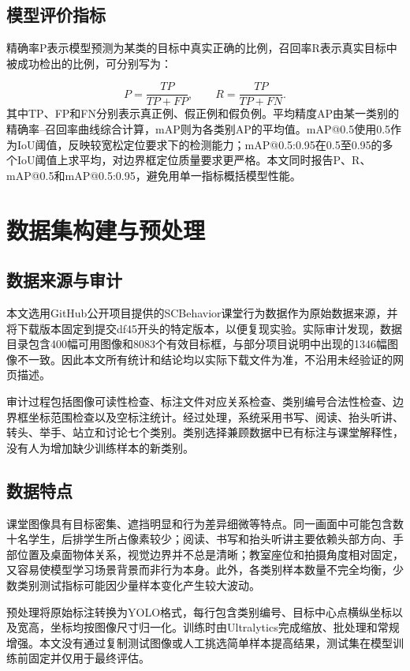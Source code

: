 \documentclass[12pt,hyperref,a4paper,UTF8]{ctexart}
\begin{document}
\subsection{模型评价指标}
精确率P表示模型预测为某类的目标中真实正确的比例，召回率R表示真实目标中被成功检出的比例，可分别写为：\par
\begin{equation}
P=\frac{TP}{TP+FP},\qquad R=\frac{TP}{TP+FN}.
\end{equation}
其中TP、FP和FN分别表示真正例、假正例和假负例。平均精度AP由某一类别的精确率--召回率曲线综合计算，mAP则为各类别AP的平均值。mAP@0.5使用0.5作为IoU阈值，反映较宽松定位要求下的检测能力；mAP@0.5:0.95在0.5至0.95的多个IoU阈值上求平均，对边界框定位质量要求更严格。本文同时报告P、R、mAP@0.5和mAP@0.5:0.95，避免用单一指标概括模型性能。\par
\section{数据集构建与预处理}
\subsection{数据来源与审计}
本文选用GitHub公开项目提供的SCBehavior课堂行为数据作为原始数据来源，并将下载版本固定到提交df45开头的特定版本，以便复现实验。实际审计发现，数据目录包含400幅可用图像和8083个有效目标框，与部分项目说明中出现的1346幅图像不一致。因此本文所有统计和结论均以实际下载文件为准，不沿用未经验证的网页描述。\par
审计过程包括图像可读性检查、标注文件对应关系检查、类别编号合法性检查、边界框坐标范围检查以及空标注统计。经过处理，系统采用书写、阅读、抬头听讲、转头、举手、站立和讨论七个类别。类别选择兼顾数据中已有标注与课堂解释性，没有人为增加缺少训练样本的新类别。\par
\subsection{数据特点}
课堂图像具有目标密集、遮挡明显和行为差异细微等特点。同一画面中可能包含数十名学生，后排学生所占像素较少；阅读、书写和抬头听讲主要依赖头部方向、手部位置及桌面物体关系，视觉边界并不总是清晰；教室座位和拍摄角度相对固定，又容易使模型学习场景背景而非行为本身。此外，各类别样本数量不完全均衡，少数类别测试指标可能因少量样本变化产生较大波动。\par
预处理将原始标注转换为YOLO格式，每行包含类别编号、目标中心点横纵坐标以及宽高，坐标均按图像尺寸归一化。训练时由Ultralytics完成缩放、批处理和常规增强。本文没有通过复制测试图像或人工挑选简单样本提高结果，测试集在模型训练前固定并仅用于最终评估。\par
\end{document}
